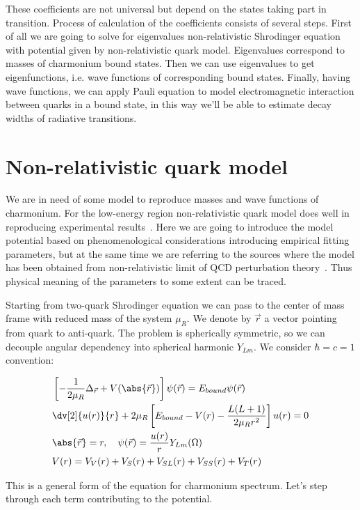 These coefficients are not universal but depend on the states taking part in transition. Process of calculation of the coefficients consists of several steps. First of all we are going to solve for eigenvalues non-relativistic Shrodinger equation with potential given by non-relativistic quark model. Eigenvalues correspond to masses of charmonium bound states. Then we can use eigenvalues to get eigenfunctions, i.e. wave functions of corresponding bound states. Finally, having wave functions, we can apply Pauli equation to model electromagnetic interaction between quarks in a bound state, in this way we'll be able to estimate decay widths of radiative transitions.

\section{Non-relativistic quark model}
We are in need of some model to reproduce masses and wave functions of charmonium. For the low-energy region non-relativistic quark model does well in reproducing experimental results~\cite{deng-charm, deng-bot}. Here we are going to introduce the model potential based on phenomenological considerations introducing empirical fitting parameters, but at the same time we are referring to the sources where the model has been obtained from non-relativistic limit of QCD perturbation theory~\cite{nrqm-perturb}. Thus physical meaning of the parameters to some extent can be traced.

Starting from two-quark Shrodinger equation we can pass to the center of mass frame with reduced mass of the system $\mu_R$. We denote by $\vec{r}$ a vector pointing from quark to anti-quark. The problem is spherically symmetric, so we can decouple angular dependency into spherical harmonic $Y_{Lm}$. We consider $\hbar = c = 1$ convention:

\begin{align}
    &\left[ -\frac{1}{2 \mu_R} \Delta_{\vec{r}} + V(\abs{\vec{r}}) \right] \psi(\vec{r}) = E_{bound} \psi(\vec{r}) \\
    &\dv[2]{u(r)}{r} + 2 \mu_R \left[ E_{bound} - V(r) - \frac{L(L+1)}{2 \mu_R r^2} \right] u(r) = 0 \label{eq:nrqm-radialeq} \\
    &\abs{\vec{r}} = r ,\quad \psi(\vec{r}) = \frac{u(r)}{r} Y_{Lm}(\Omega) \\
    &V(r) = V_V(r) +V_S(r) + V_{SL}(r) + V_{SS}(r) + V_T(r)
\end{align}

This is a general form of the equation for charmonium spectrum. Let's step through each term contributing to the potential.

